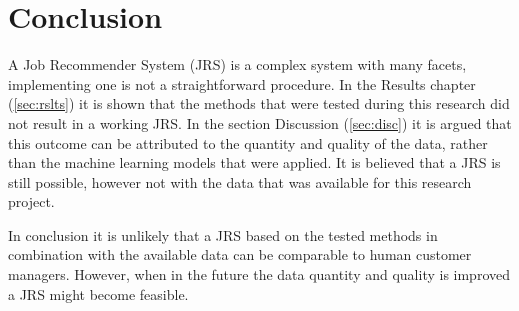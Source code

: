\section{Conclusion}
\label{sec:concl}

A Job Recommender System (JRS) is a complex system with many facets, implementing one is not a straightforward procedure.
In the Results chapter (\ref{sec:rslts}) it is shown that the methods that were tested during this research did not result in a working JRS.
In the section Discussion (\ref{sec:disc}) it is argued that this outcome can be attributed to the quantity and quality of the data, rather than the machine learning models that were applied.
It is believed that a JRS is still possible, however not with the data that was available for this research project.

In conclusion it is unlikely that a JRS based on the tested methods in combination with the available data can be comparable to human customer managers.
However, when in the future the data quantity and quality is improved a JRS might become feasible.




